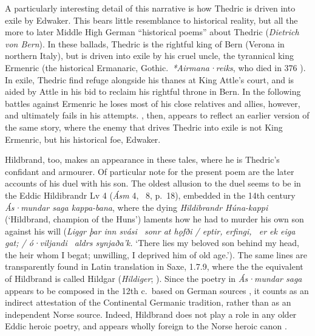 A particularly interesting detail of this narrative is how Thedric is driven into exile by Edwaker.  This bears little resemblance to historical reality, but all the more to later Middle High German “historical poems” about Thedric (\emph{Dietrich von Bern}).  In these ballads, Thedric is the rightful king of Bern (Verona in northern Italy), but is driven into exile by his cruel uncle, the tyrannical king Ermenric (the historical Ermanaric, Gothic.~\emph{*Airmana·reiks}, who died in 376 \ce).  In exile, Thedric find refuge alongside his thanes at King Attle’s court, and is aided by Attle in his bid to reclaim his rightful throne in Bern.  In the following battles against Ermenric he loses most of his close relatives and allies, however, and ultimately fails in his attempts.  \Hildebrandslied, then, appears to reflect an earlier version of the same story, where the enemy that drives Thedric into exile is not King Ermenric, but his historical foe, Edwaker.

Hildbrand, too, makes an appearance in these tales, where he is Thedric’s confidant and armourer.  Of particular note for the present poem are the later accounts of his duel with his son.  The oldest allusion to the duel seems to be in the Eddic Hildibrandr Lv 4 (\emph{Ásm} 4, \Skp\ 8, p.~18), embedded in the 14th century \emph{Ás·mundar saga kappa-bana}, where the dying \emph{Hildibrandr Húna-kappi} (‘Hildbrand, champion of the Huns’) laments how he had to murder his own son against his will (\emph{Liggr þar inn svási \hld\ sonr at hǫfði / eptir, erfingi, \hld\ er ek eiga gat; / ó·viljandi \hld\ aldrs synjaða’k.} ‘There lies my beloved son behind my head, the heir whom I begat; unwilling, I deprived him of old age.’).  The same lines are transparently found in Latin translation in Saxe, 1.7.9, where the the equivalent of Hildbrand is called Hildgar (\emph{Hildiger}; \cite[508--9]{Saxo2015}).  Since the poetry in \emph{Ás·mundar saga} appears to be composed in the 12th c.~based on German sources \parencites[21]{Halvorsen1951}{Frans2026}, it counts as an indirect attestation of the Continental Germanic tradition, rather than as an independent Norse source.
Indeed, Hildbrand does not play a role in any older Eddic heroic poetry, and appears wholly foreign to the Norse heroic canon \parencite[206, n. 4]{Frans2026}.

